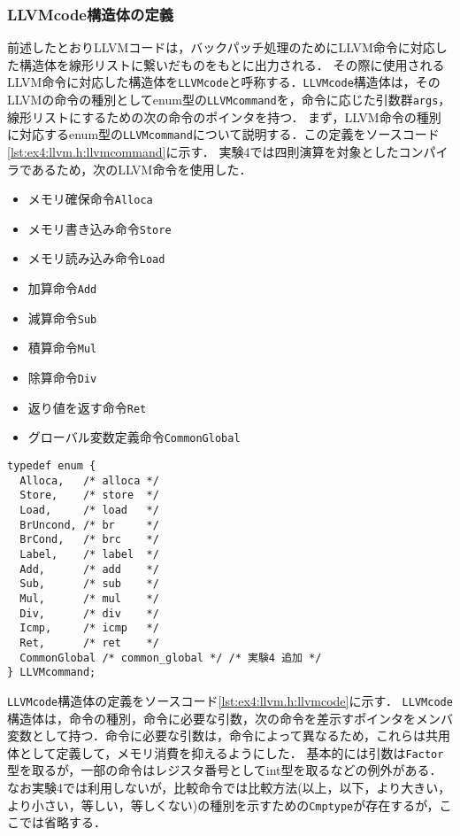 \documentclass[uplatex]{jsarticle}
\begin{document}
\subsubsection{LLVMcode構造体の定義}
前述したとおりLLVMコードは，バックパッチ処理のためにLLVM命令に対応した構造体を線形リストに繋いだものをもとに出力される．
その際に使用されるLLVM命令に対応した構造体を\verb#LLVMcode#と呼称する．\verb#LLVMcode#構造体は，そのLLVMの命令の種別としてenum型の\verb#LLVMcommand#を，命令に応じた引数群\verb#args#，線形リストにするための次の命令のポインタを持つ．
まず，LLVM命令の種別に対応するenum型の\verb#LLVMcommand#について説明する．この定義をソースコード\ref{lst:ex4:llvm.h:llvmcommand}に示す．
実験4では四則演算を対象としたコンパイラであるため，次のLLVM命令を使用した．
\begin{itemize}
  \item {メモリ確保命令\verb#Alloca#}
  \item {メモリ書き込み命令\verb#Store#}
  \item {メモリ読み込み命令\verb#Load#}
  \item {加算命令\verb#Add#}
  \item {減算命令\verb#Sub#}
  \item {積算命令\verb#Mul#}
  \item {除算命令\verb#Div#}
  \item {返り値を返す命令\verb#Ret#}
  \item {グローバル変数定義命令\verb#CommonGlobal#}
\end{itemize}
\begin{lstlisting}[caption=LLVMコマンドを表す列挙型LLVMcommand,label=lst:ex4:llvm.h:llvmcommand]
typedef enum {
  Alloca,   /* alloca */
  Store,    /* store  */
  Load,     /* load   */
  BrUncond, /* br     */
  BrCond,   /* brc    */
  Label,    /* label  */
  Add,      /* add    */
  Sub,      /* sub    */
  Mul,      /* mul    */
  Div,      /* div    */
  Icmp,     /* icmp   */
  Ret,      /* ret    */
  CommonGlobal /* common_global */ /* 実験4 追加 */
} LLVMcommand;
\end{lstlisting}

\verb#LLVMcode#構造体の定義をソースコード\ref{lst:ex4:llvm.h:llvmcode}に示す．
\verb#LLVMcode#構造体は，命令の種別，命令に必要な引数，次の命令を差示すポインタをメンバ変数として持つ．命令に必要な引数は，命令によって異なるため，これらは共用体として定義して，メモリ消費を抑えるようにした．
基本的には引数は\verb#Factor#型を取るが，一部の命令はレジスタ番号としてint型を取るなどの例外がある．
なお実験4では利用しないが，比較命令では比較方法(以上，以下，より大きい，より小さい，等しい，等しくない)の種別を示すための\verb#Cmptype#が存在するが，ここでは省略する．
\end{document}
